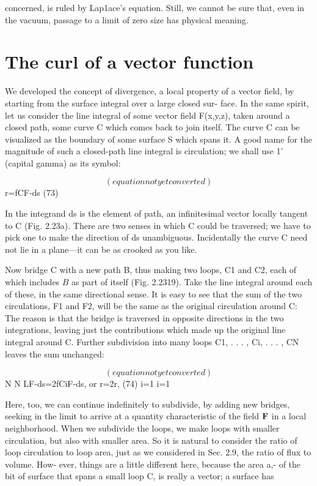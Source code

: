  

concerned, is ruled by Lap1ace's equation. Still, we cannot be sure
that, even in the vacuum, passage to a limit of zero size has physical
meaning.

\section{The curl of a vector function}

We developed the concept of divergence, a local property of a vector
field, by starting from the surface integral over a large closed sur-
face. In the same spirit, let us consider the line integral of some vector
field F(x,y,z), taken around a closed path, some curve C which
comes back to join itself. The curve C can be visualized as the
boundary of some surface S which spans it. A good name for the
magnitude of such a closed-path line integral is circulation; we shall
use 1' (capital gamma) as its symbol:

\begin{equation}
(equation not yet converted)
\end{equation}
r=fCF-ds (73)

In the integrand ds is the element of path, an infinitesimal vector
locally tangent to C (Fig. 2.23a). There are two senses in which C
could be traversed; we have to pick one to make the direction of ds
unambiguous. Incidentally the curve C need not lie in a plane---it
can be as crooked as you like.

Now bridge C with a new path B, thus making two loops, C1 and
C2, each of which includes $B$ as part of itself (Fig. 2.2319). Take the
line integral around each of these, in the same directional sense. It
is easy to see that the sum of the two circulations, F1 and F2, will be
the same as the original circulation around C: The reason is that the
bridge is traversed in opposite directions in the two integrations,
leaving just the contributions which made up the original line integral
around C. Further subdivision into many loops C1, . . . , Ci, . . . , CN
leaves the sum unchanged:

\begin{equation}
(equation not yet converted)
\end{equation}
N N
LF-ds=2fCiF-ds, or r=2r, (74)
i=1 i=1

Here, too, we can continue indefinitely to subdivide, by adding
new bridges, seeking in the limit to arrive at a quantity characteristic
of the field $\mathbf{F}$ in a local neighborhood. When we subdivide the loops,
we make loops with smaller circulation, but also with smaller area.
So it is natural to consider the ratio of loop circulation to loop area,
just as we considered in Sec. 2.9, the ratio of flux to volume. How-
ever, things are a little different here, because the area a,- of the bit
of surface that spans a small loop C, is really a vector; a surface has


